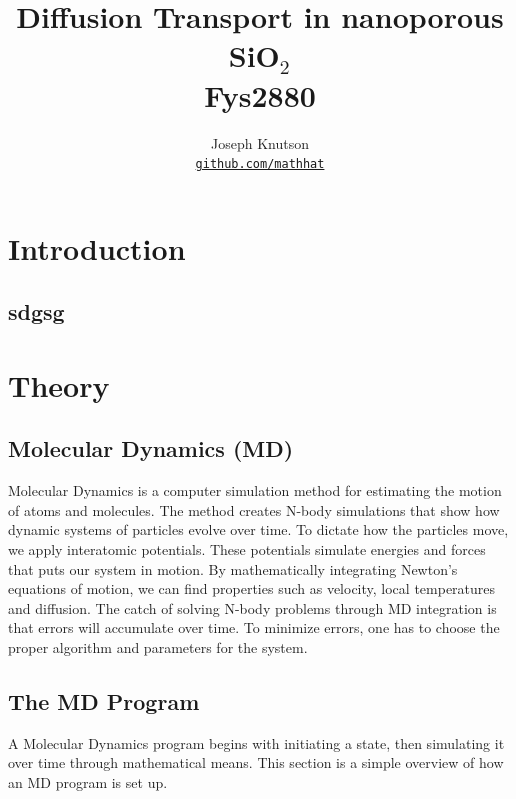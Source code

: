 \documentclass[10pt, a4paper]{report}
\title{Diffusion Transport in nanoporous SiO$_2$ \\
  \hrulefill\small{ Fys2880 }\hrulefill}
\author{Joseph Knutson \\
\href{https://github.com/mathhat/}{\texttt{github.com/mathhat}}}
\begin{document}
\begin{titlepage}
\maketitle
\begin{abstract}

\end{abstract}

\tableofcontents
\end{titlepage}
\chapter{Introduction}
\section*{sdgsg}


\chapter{Theory}

\section*{Molecular Dynamics (MD)}
Molecular Dynamics is a computer simulation method for estimating the motion of atoms and molecules.
The method creates N-body simulations that show how dynamic systems of particles evolve over time. To dictate how the particles move, we apply interatomic potentials. These potentials
simulate energies and forces that puts our system in motion. By mathematically integrating Newton's equations of motion,
we can find properties such as velocity, local temperatures and diffusion. The catch of solving N-body problems through MD integration is that errors will accumulate over time.
To minimize errors, one has to choose the proper algorithm and parameters for the system.

\section*{The MD Program}
A Molecular Dynamics program begins with initiating a state, then simulating it over time through mathematical means.
This section is a simple overview of how an MD program is set up.
\end{document}
